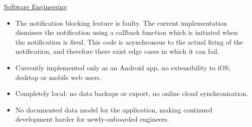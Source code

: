 \underline{Software Engineering}
\begin{itemize}
    \item The notification blocking feature is faulty. The current implementation dismisses the notification using a callback function which is initiated when the notification is fired. This code is asynchronous to the actual firing of the notification, and therefore there exist edge cases in which it can fail.
    \item Currently implemented only as an Android app, no extensibility to iOS, desktop or mobile web users.
    \item Completely local: no data backups or export, no online cloud synchronisation.
    \item No documented data model for the application, making continued development harder for newly-onboarded engineers.
\end{itemize}
